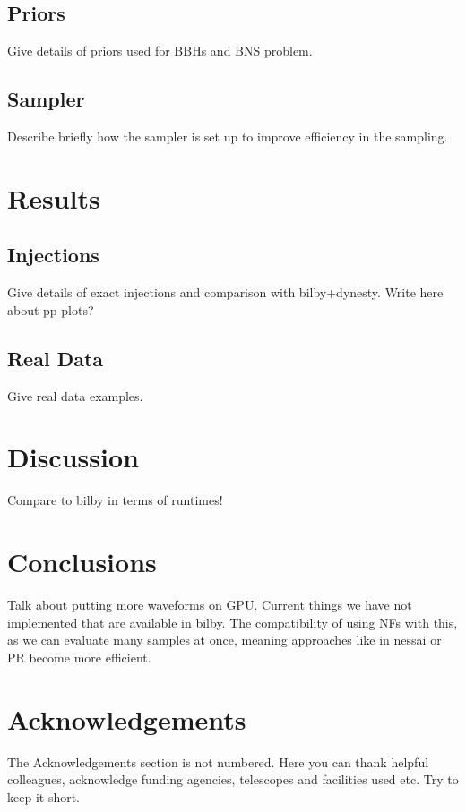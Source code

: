 \documentclass[fleqn,usenatbib]{mnras}
\begin{document}
\subsection{Priors}

Give details of priors used for BBHs and BNS problem.

\subsection{Sampler}

Describe briefly how the sampler is set up to improve efficiency in the sampling. 

\section{Results}

\subsection{Injections}

Give details of exact injections and comparison with bilby+dynesty. Write here about pp-plots?

\subsection{Real Data}

Give real data examples.

\section{Discussion}

Compare to bilby in terms of runtimes!

\section{Conclusions}

Talk about putting more waveforms on GPU. Current things we have not implemented that are available in bilby. The compatibility of using NFs with this, as we can evaluate many samples at once, meaning approaches like in nessai or PR become more efficient. 

\section*{Acknowledgements}

The Acknowledgements section is not numbered. Here you can thank helpful
colleagues, acknowledge funding agencies, telescopes and facilities used etc.
Try to keep it short.
\end{document}
